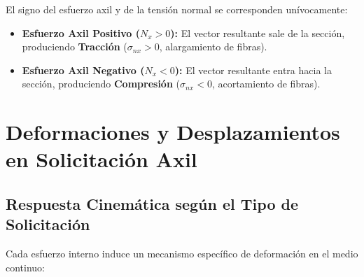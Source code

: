 El signo del esfuerzo axil y de la tensión normal se corresponden unívocamente:
\begin{itemize}
    \item \textbf{Esfuerzo Axil Positivo ($N_x > 0$):} El vector resultante sale de la sección, produciendo \textbf{Tracción} ($\sigma_{nx} > 0$, alargamiento de fibras).
    \item \textbf{Esfuerzo Axil Negativo ($N_x < 0$):} El vector resultante entra hacia la sección, produciendo \textbf{Compresión} ($\sigma_{nx} < 0$, acortamiento de fibras).
\end{itemize}

\section{Deformaciones y Desplazamientos en Solicitación Axil}

\subsection{Respuesta Cinemática según el Tipo de Solicitación}

Cada esfuerzo interno induce un mecanismo específico de deformación en el medio continuo:
\begin{table}[H]
    \centering
    \caption{Correspondencia entre esfuerzos seccionales, tensiones y tipos de deformación.}
    \label{tab:esfuerzos_deformaciones}
\end{table}


